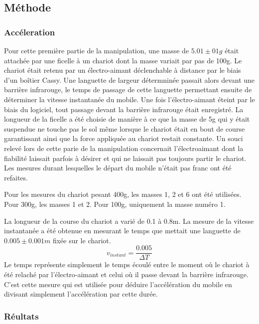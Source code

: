 \subsection{Méthode}

\subsubsection{Accéleration}
Pour cette première partie de la manipulation, une masse de $5.01 \pm 01g$ était attachée par une ficelle à un chariot dont la masse variait par pas de 100g. Le chariot était retenu par un électro-aimant déclenchable à distance par le biais d'un boîtier Cassy. Une languette de largeur détermninée passait alors devant une barrière infrarouge, le temps de passage de cette languette permettant ensuite de déterminer la vitesse instantanée du mobile. Une fois l'électro-aimant éteint par le biais du logiciel, tout passage devant la barrière infrarouge était enregistré.
La longueur de la ficelle a été choisie de manière à ce que la masse de 5g qui y était suspendue ne touche pas le sol même lorsque le chariot était en bout de course garantissant ainsi que la force appliquée au chariot restait constante.
Un souci relevé lors de cette parie de la manipulation concernait l'électroaimant dont la fiabilité laissait parfois à désirer et qui ne laissait pas toujours partir le chariot. Les mesures durant lesquelles le départ du mobile n'était pas franc ont été refaites.

Pour les mesures du chariot pesant 400g, les masses 1, 2 et 6 ont été utilisées. Pour 300g, les masses 1 et 2. Pour 100g, uniquement la masse numéro 1.

La longueur de la course du chariot a varié de 0.1 à 0.8m. La mesure de la vitesse instantanée a été obtenue en mesurant le temps que mettait une languette de $0.005 \pm 0.001m$ fixée sur le chariot.
\begin{equation}
    v_{instant} = \frac{0.005}{\Delta T}
\end{equation}
Le temps représente simplement le temps écoulé entre le moment où le chariot à été relaché par l'électro-aimant et celui où il passe devant la barrière infrarouge. C'est cette mesure qui est utilisée pour déduire l'accélération du mobile en divisant simplement l'accélération par cette durée.

\subsubsection{Réultats}

